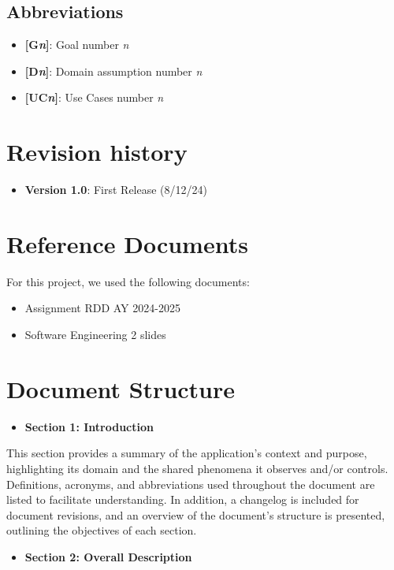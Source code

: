 \subsection{Abbreviations}
\begin{itemize}
    \item \textbf{[G\textit{n}]}: Goal number \textit{n}
    \item \textbf{[D\textit{n}]}: Domain assumption number \textit{n}
    \item \textbf{[UC\textit{n}]}: Use Cases number \textit{n}
\end{itemize}
\section{Revision history}
\begin{itemize}
    \item \textbf{Version 1.0}: First Release (8/12/24)
\end{itemize}
\section{Reference Documents}
For this project, we used the following documents: 
\begin{itemize}
    \item Assignment RDD AY 2024-2025
    \item Software Engineering 2 slides
\end{itemize}

\section{Document Structure}

\begin{itemize}
    \item\textbf{Section 1: Introduction} 
\end{itemize}
This section provides a summary of the application's context and purpose, highlighting its domain and the shared phenomena it observes and/or controls. Definitions, acronyms, and abbreviations used throughout the document are listed to facilitate understanding. In addition, a changelog is included for document revisions, and an overview of the document’s structure is presented, outlining the objectives of each section.

\begin{itemize}
    \item\textbf{Section 2: Overall Description} 
\end{itemize}

